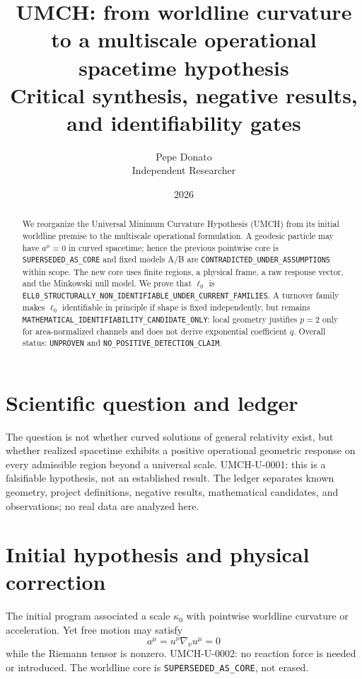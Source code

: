 \documentclass[11pt,a4paper]{article}
\title{UMCH: from worldline curvature to a multiscale operational spacetime hypothesis\\Critical synthesis, negative results, and identifiability gates}
\author{Pepe Donato\\Independent Researcher}\date{2026}
\begin{document}
\maketitle
\begin{abstract}
We reorganize the Universal Minimum Curvature Hypothesis (UMCH) from its initial worldline premise to the multiscale operational formulation. A geodesic particle may have $a^\mu=0$ in curved spacetime; hence the previous pointwise core is \verb|SUPERSEDED_AS_CORE| and fixed models A/B are \verb|CONTRADICTED_UNDER_ASSUMPTIONS| within scope. The new core uses finite regions, a physical frame, a raw response vector, and the Minkowski null model. We prove that $\ell_0$ is \verb|ELL0_STRUCTURALLY_NON_IDENTIFIABLE_UNDER_CURRENT_FAMILIES|. A turnover family makes $\ell_0$ identifiable in principle if shape is fixed independently, but remains \verb|MATHEMATICAL_IDENTIFIABILITY_CANDIDATE_ONLY|: local geometry justifies $p=2$ only for area-normalized channels and does not derive exponential coefficient $q$. Overall status: \verb|UNPROVEN| and \verb|NO_POSITIVE_DETECTION_CLAIM|.
\end{abstract}

\section{Scientific question and ledger}\label{sec:u-question}
The question is not whether curved solutions of general relativity exist, but whether realized spacetime exhibits a positive operational geometric response on every admissible region beyond a universal scale. UMCH-U-0001: this is a falsifiable hypothesis, not an established result. The ledger separates known geometry, project definitions, negative results, mathematical candidates, and observations; no real data are analyzed here.

\section{Initial hypothesis and physical correction}\label{sec:u-history}
The initial program associated a scale $\kappa_0$ with pointwise worldline curvature or acceleration. Yet free motion may satisfy
\begin{equation}\label{eq:u-geodesic}a^\mu=u^\nu\nabla_\nu u^\mu=0
\end{equation}
while the Riemann tensor is nonzero. UMCH-U-0002: no reaction force is needed or introduced. The worldline core is \verb|SUPERSEDED_AS_CORE|, not erased.
\end{document}
